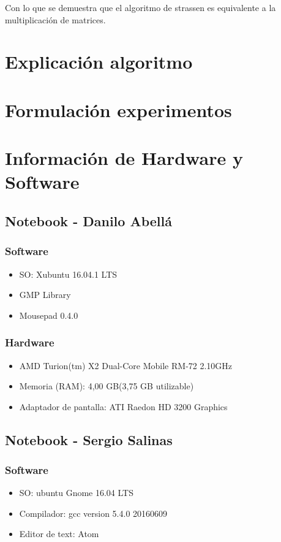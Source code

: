 \documentclass[12pt,letterpaper]{scrartcl}
\begin{document}
Con  lo que se demuestra que el algoritmo de strassen es equivalente a la multiplicación de matrices.
\section{Explicación algoritmo}


\newpage

\section{Formulación experimentos}


\newpage

\section{Información de Hardware y Software}


\subsection{ Notebook - Danilo Abellá}
\subsubsection{Software}
\begin{itemize}
\item SO: Xubuntu 16.04.1 LTS
\item GMP Library
\item Mousepad 0.4.0
\end{itemize}

\subsubsection{Hardware}
\begin{itemize}
\item AMD Turion(tm) X2 Dual-Core Mobile RM-72 2.10GHz
\item Memoria (RAM): 4,00 GB(3,75 GB utilizable)
\item Adaptador de pantalla: ATI Raedon HD 3200 Graphics
\end{itemize}



\subsection{Notebook - Sergio Salinas}
\subsubsection{Software}
\begin{itemize}
\item  SO: ubuntu Gnome 16.04 LTS
\item Compilador: gcc version 5.4.0 20160609
\item Editor de text: Atom
\end{itemize}
\end{document}
